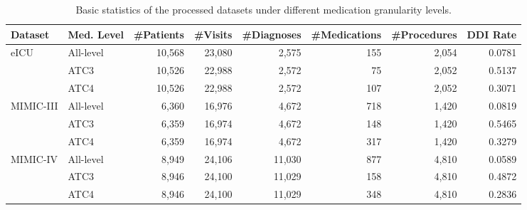 \documentclass[manuscript,review]{acmart}
\begin{document}
\begin{table}
\centering
\scriptsize
\caption{Basic statistics of the processed datasets under different medication granularity levels.}
\label{tab:dataset_statistics}
\begin{tabular}{llrrrrrr}
\toprule
\textbf{Dataset} & \textbf{Med. Level} & \textbf{\#Patients} & \textbf{\#Visits} & \textbf{\#Diagnoses} & \textbf{\#Medications} & \textbf{\#Procedures} & \textbf{DDI Rate} \\
\midrule
\multirow{3}{*}{eICU} 
& All-level & 10,568 & 23,080 & 2,575 & 155 & 2,054 & 0.0781 \\
& ATC3      & 10,526 & 22,988 & 2,572 & 75  & 2,052 & 0.5137 \\
& ATC4      & 10,526 & 22,988 & 2,572 & 107 & 2,052 & 0.3071 \\
\midrule
\multirow{3}{*}{MIMIC-III} 
& All-level & 6,360 & 16,976 & 4,672 & 718 & 1,420 & 0.0819 \\
& ATC3      & 6,359 & 16,974 & 4,672 & 148 & 1,420 & 0.5465 \\
& ATC4      & 6,359 & 16,974 & 4,672 & 317 & 1,420 & 0.3279 \\
\midrule
\multirow{3}{*}{MIMIC-IV} 
& All-level & 8,949 & 24,106 & 11,030 & 877 & 4,810 & 0.0589 \\
& ATC3      & 8,946 & 24,100 & 11,029 & 158 & 4,810 & 0.4872 \\
& ATC4      & 8,946 & 24,100 & 11,029 & 348 & 4,810 & 0.2836 \\
\bottomrule
\end{tabular}
\end{table}




\end{document}
